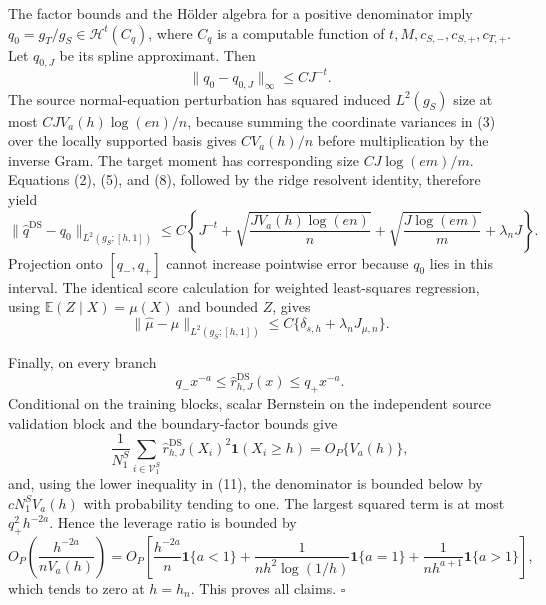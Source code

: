 The factor bounds and the Hölder algebra for a positive denominator imply \(q_0=g_T/g_S\in\mathcal H^t(C_q)\), where \(C_q\) is a computable function of \(t,M,c_{S,-},c_{S,+},c_{T,+}\).  Let \(q_{0,J}\) be its spline approximant.  Then
\[
 \|q_0-q_{0,J}\|_\infty\le CJ^{-t}.
\tag{8}
\]
The source normal-equation perturbation has squared induced \(L^2(g_S)\) size at most \(CJ V_a(h)\log(en)/n\), because summing the coordinate variances in (3) over the locally supported basis gives \(CV_a(h)/n\) before multiplication by the inverse Gram.  The target moment has corresponding size \(CJ\log(em)/m\).  Equations (2), (5), and (8), followed by the ridge resolvent identity, therefore yield
\[
 \|\widehat q^{\mathrm{DS}}-q_0\|_{L^2(g_S;[h,1])}
 \le C\left\{J^{-t}+\sqrt{\frac{JV_a(h)\log(en)}n}
 +\sqrt{\frac{J\log(em)}m}+\lambda_nJ\right\}.
\tag{9}
\]
Projection onto \([q_-,q_+]\) cannot increase pointwise error because \(q_0\) lies in this interval.  The identical score calculation for weighted least-squares regression, using \(\mathbb E(Z\mid X)=\mu(X)\) and bounded \(Z\), gives
\[
 \|\widehat\mu-\mu\|_{L^2(g_S;[h,1])}
 \le C\{\delta_{s,h}+\lambda_nJ_{\mu,n}\}.
\tag{10}
\]

Finally, on every branch
\[
 q_-x^{-a}\le\widehat r^{\mathrm{DS}}_{h,J}(x)\le q_+x^{-a}.
\tag{11}
\]
Conditional on the training blocks, scalar Bernstein on the independent source validation block and the boundary-factor bounds give
\[
 \frac1{N^S_1}\sum_{i\in\mathcal V^S_1}
 \widehat r^{\mathrm{DS}}_{h,J}(X_i)^2\mathbf1(X_i\ge h)=O_P\{V_a(h)\},
\tag{12}
\]
and, using the lower inequality in (11), the denominator is bounded below by \(cN^S_1V_a(h)\) with probability tending to one.  The largest squared term is at most \(q_+^2h^{-2a}\).  Hence the leverage ratio is bounded by
\[
 O_P\!\left(\frac{h^{-2a}}{nV_a(h)}\right)
 =O_P\!\left[
 \frac{h^{-2a}}n\mathbf1\{a<1\}
 +\frac1{nh^2\log(1/h)}\mathbf1\{a=1\}
 +\frac1{nh^{a+1}}\mathbf1\{a>1\}
 \right],
\tag{13}
\]
which tends to zero at \(h=h_n\).  This proves all claims. \(\square\)